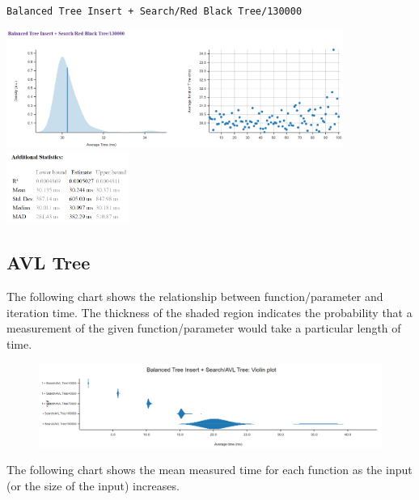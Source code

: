 \documentclass[11pt, letterpaper]{article}
\begin{document}
\texttt{Balanced Tree Insert + Search/Red Black Tree/130000}
\begin{paracol}{3}
    \centering        
    \includegraphics[width=11cm]{benchmarks/Red_black_tree/130000/plots.png}
    \switchcolumn
    \vspace*{\fill}
    \includegraphics[width=4cm]{benchmarks/Red_black_tree/130000/stats.png}
    \vspace*{\fill}
\end{paracol}
\newpage
\subsection{AVL Tree}
The following chart shows the relationship between function/parameter and iteration time. The thickness of the shaded region indicates the probability that a measurement of the given function/parameter would take a particular length of time.
\begin{figure}[htbp]
    \centering
    \includegraphics[width=15cm]{benchmarks/AVL/violin.png}
    \label{Violin_AVL}
\end{figure}

The following chart shows the mean measured time for each function as the input (or the size of the input) increases. \\
\end{document}
